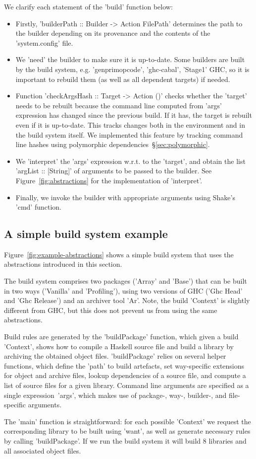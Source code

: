 \noindent We clarify each statement of the \lst'build' function below:
\begin{itemize}
  \item Firstly, \lst'builderPath :: Builder -> Action FilePath' determines the
  path to the builder depending on its provenance and the contents of the
  \lst'system.config' file.
  \item We \lst'need' the builder to make sure it is up-to-date. Some builders
  are built by the build system, e.g. \lst'genprimopcode',
  \lst'ghc-cabal', \lst'Stage1' GHC, so it is important to rebuild them (as well
  as all dependent targets) if needed.
  \item Function \lst'checkArgsHash :: Target -> Action ()' checks whether the
  \lst'target' needs to be rebuilt because the command line computed from
  \lst'args' expression has changed since the previous build. If it has,
  the target is rebuilt even if it is up-to-date. This tracks changes both in
  the environment and in the build system itself. We implemented this feature
  by tracking command line hashes using polymorphic dependencies~\S\ref{sec:polymorphic}.
  \item We \lst'interpret' the \lst'args' expression w.r.t. to the
  \lst'target', and obtain the list \lst'argList :: [String]' of arguments to be
  passed to the builder. See Figure~\ref{fig:abstractions} for the implementation of
  \lst'interpret'.
  \item Finally, we invoke the builder with appropriate arguments using Shake's
  \lst'cmd' function.
\end{itemize}

\subsection{A simple build system example}

Figure~\ref{fig:example-abstractions} shows a simple build system that uses the
abstractions introduced in this section.

The build system comprises two packages (\lst'Array' and \lst'Base') that can
be built in two ways (\lst'Vanilla' and \lst'Profiling'), using two versions
of GHC (\lst'Ghc Head' and \lst'Ghc Release') and an archiver tool \lst'Ar'.
Note, the build \lst'Context' is slightly different from GHC, but this does not
prevent us from using the same abstractions.

Build rules are generated by the \lst'buildPackage' function, which given a
build \lst'Context', shows how to compile a Haskell source file and build a
library by archiving the obtained object files. \lst'buildPackage' relies on
several helper functions, which define the \lst'path' to build artefacts,
set way-specific extensions for object and archive files, lookup
dependencies of a source file, and compute a list of source files for a given
library. Command line arguments are specified as a single expression~\lst'args',
which makes use of package-, way-, builder-, and file-specific arguments.

The \lst'main' function is straightforward: for each possible \lst'Context'
we request the corresponding library to be built using \lst'want', as well as
generate necessary rules by calling \lst'buildPackage'. If we run the build
system it will build 8 libraries and all associated object files.

